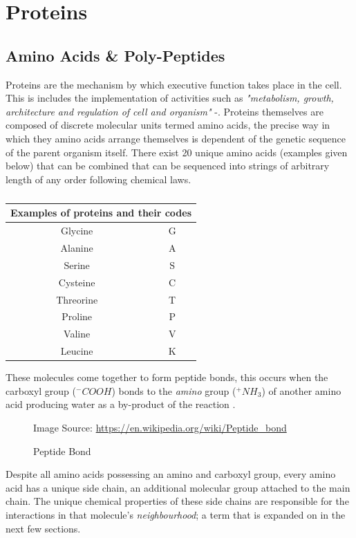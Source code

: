 \section{Proteins}
\subsection{Amino Acids \& Poly-Peptides}
Proteins are the mechanism by which
executive function takes place in the cell. 
This is includes the implementation
of activities such as \emph{"metabolism, growth,
architecture and regulation of cell and organism"} -\cite{lesk}.
Proteins themselves are composed
of discrete molecular units termed amino acids, the precise
way in which they amino acids arrange themselves is dependent
of the genetic sequence of the parent organism itself.
There exist 20 unique amino acids (examples given below) that can be combined
that can be sequenced into strings of 
arbitrary length of any order following chemical laws.
\begin{table}
    \begin{center}
        \caption{}
\begin{tabular}{||c | c||}
    \hline
    \multicolumn{2}{||c||}{Examples of proteins and their codes}\\
    \hline\hline
    Glycine & G  \\ 
    \hline
    Alanine & A \\
    \hline
    Serine & S  \\
    \hline
    Cysteine & C  \\
    \hline
    Threorine & T \\ 
    \hline
    Proline & P \\
    \hline
    Valine &  V\\
    \hline
    Leucine & K \\ [1ex] 
    \hline
\end{tabular}
\end{center}
\end{table}
These molecules come together to form peptide bonds,
this occurs when the carboxyl group ($^-COOH$) bonds to the
\emph{amino} group ($^+NH_3$) of another amino acid producing 
water as a by-product of the reaction \cite{lesk}.
\begin{figure}
    \caption{Peptide Bond}
     
    \scriptsize{\dag Image Source: \url{https://en.wikipedia.org/wiki/Peptide_bond}}
\end{figure}
Despite all amino acids possessing an amino and
carboxyl group, every amino acid has a unique side chain,
an additional molecular group attached to the main chain.
The unique chemical properties of these side chains are responsible
for the interactions in that molecule's \emph{neighbourhood};
a term that is expanded on in the next few sections.


